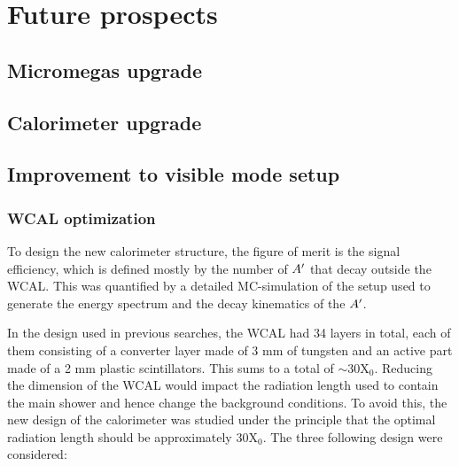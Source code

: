 
\newcommand{\pdirfive}{chapters/plots/chapter5}

\chapter{Future prospects} %
\label{chapter5} %


\section{Micromegas upgrade}
\label{ch5:sec:mm-upgrades}

\section{Calorimeter upgrade}
\label{ch5:sec:cal-upgrades}

\section{Improvement to visible mode setup}
\label{ch5:sec:new-vismode-setup}

\subsection{WCAL optimization}
\label{ch5:sec:new-vismode-setup-wcal}

To design the new calorimeter structure, the figure of merit is the signal efficiency, which is defined mostly by the number of $A'$ that decay outside the WCAL. This was quantified by a detailed MC-simulation of the setup used to generate the energy spectrum and the decay kinematics of the $A'$.

In the design used in previous searches, the WCAL had 34 layers in total, each of them consisting of a converter layer made of 3 mm of tungsten and an active part made of a 2 mm plastic scintillators. This sums to a total of $\sim$30X$_0$. Reducing the dimension of the WCAL would impact the radiation length used to contain the main shower and hence change the background conditions. To avoid this, the new design of the calorimeter was studied under the principle that the optimal radiation length should be approximately 30X$_0$. The three following design were considered:

